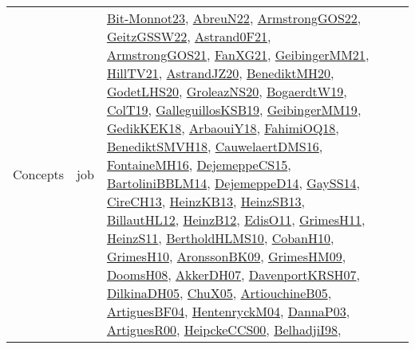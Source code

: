 {\begin{longtable}{lp{3cm}>{\raggedright}p{6cm}>{\raggedright}p{6cm}p{8cm}}
Concepts & job & \href{papers/Bit-Monnot23.pdf}{Bit-Monnot23}\cite{Bit-Monnot23}, \href{articles/AbreuN22.pdf}{AbreuN22}\cite{AbreuN22}, \href{papers/ArmstrongGOS22.pdf}{ArmstrongGOS22}\cite{ArmstrongGOS22}, \href{papers/GeitzGSSW22.pdf}{GeitzGSSW22}\cite{GeitzGSSW22}, \href{papers/Astrand0F21.pdf}{Astrand0F21}\cite{Astrand0F21}, \href{papers/ArmstrongGOS21.pdf}{ArmstrongGOS21}\cite{ArmstrongGOS21}, \href{articles/FanXG21.pdf}{FanXG21}\cite{FanXG21}, \href{papers/GeibingerMM21.pdf}{GeibingerMM21}\cite{GeibingerMM21}, \href{papers/HillTV21.pdf}{HillTV21}\cite{HillTV21}, \href{articles/AstrandJZ20.pdf}{AstrandJZ20}\cite{AstrandJZ20}, \href{articles/BenediktMH20.pdf}{BenediktMH20}\cite{BenediktMH20}, \href{papers/GodetLHS20.pdf}{GodetLHS20}\cite{GodetLHS20}, \href{papers/GroleazNS20.pdf}{GroleazNS20}\cite{GroleazNS20}, \href{papers/BogaerdtW19.pdf}{BogaerdtW19}\cite{BogaerdtW19}, \href{papers/ColT19.pdf}{ColT19}\cite{ColT19}, \href{papers/GalleguillosKSB19.pdf}{GalleguillosKSB19}\cite{GalleguillosKSB19}, \href{papers/GeibingerMM19.pdf}{GeibingerMM19}\cite{GeibingerMM19}, \href{articles/GedikKEK18.pdf}{GedikKEK18}\cite{GedikKEK18}, \href{papers/ArbaouiY18.pdf}{ArbaouiY18}\cite{ArbaouiY18}, \href{articles/FahimiOQ18.pdf}{FahimiOQ18}\cite{FahimiOQ18}, \href{papers/BenediktSMVH18.pdf}{BenediktSMVH18}\cite{BenediktSMVH18}, \href{papers/CauwelaertDMS16.pdf}{CauwelaertDMS16}\cite{CauwelaertDMS16}, \href{papers/FontaineMH16.pdf}{FontaineMH16}\cite{FontaineMH16}, \href{papers/DejemeppeCS15.pdf}{DejemeppeCS15}\cite{DejemeppeCS15}, \href{papers/BartoliniBBLM14.pdf}{BartoliniBBLM14}\cite{BartoliniBBLM14}, \href{papers/DejemeppeD14.pdf}{DejemeppeD14}\cite{DejemeppeD14}, \href{papers/GaySS14.pdf}{GaySS14}\cite{GaySS14}, \href{papers/CireCH13.pdf}{CireCH13}\cite{CireCH13}, \href{papers/HeinzKB13.pdf}{HeinzKB13}\cite{HeinzKB13}, \href{articles/HeinzSB13.pdf}{HeinzSB13}\cite{HeinzSB13}, \href{papers/BillautHL12.pdf}{BillautHL12}\cite{BillautHL12}, \href{papers/HeinzB12.pdf}{HeinzB12}\cite{HeinzB12}, \href{papers/EdisO11.pdf}{EdisO11}\cite{EdisO11}, \href{papers/GrimesH11.pdf}{GrimesH11}\cite{GrimesH11}, \href{papers/HeinzS11.pdf}{HeinzS11}\cite{HeinzS11}, \href{papers/BertholdHLMS10.pdf}{BertholdHLMS10}\cite{BertholdHLMS10}, \href{papers/CobanH10.pdf}{CobanH10}\cite{CobanH10}, \href{papers/GrimesH10.pdf}{GrimesH10}\cite{GrimesH10}, \href{papers/AronssonBK09.pdf}{AronssonBK09}\cite{AronssonBK09}, \href{papers/GrimesHM09.pdf}{GrimesHM09}\cite{GrimesHM09}, \href{papers/DoomsH08.pdf}{DoomsH08}\cite{DoomsH08}, \href{papers/AkkerDH07.pdf}{AkkerDH07}\cite{AkkerDH07}, \href{papers/DavenportKRSH07.pdf}{DavenportKRSH07}\cite{DavenportKRSH07}, \href{papers/DilkinaDH05.pdf}{DilkinaDH05}\cite{DilkinaDH05}, \href{papers/ChuX05.pdf}{ChuX05}\cite{ChuX05}, \href{papers/ArtiouchineB05.pdf}{ArtiouchineB05}\cite{ArtiouchineB05}, \href{papers/ArtiguesBF04.pdf}{ArtiguesBF04}\cite{ArtiguesBF04}, \href{papers/HentenryckM04.pdf}{HentenryckM04}\cite{HentenryckM04}, \href{papers/DannaP03.pdf}{DannaP03}\cite{DannaP03}, \href{articles/ArtiguesR00.pdf}{ArtiguesR00}\cite{ArtiguesR00}, \href{articles/HeipckeCCS00.pdf}{HeipckeCCS00}\cite{HeipckeCCS00}, \href{articles/BelhadjiI98.pdf}{BelhadjiI98}\cite{BelhadjiI98}, 
\end{longtable}}
